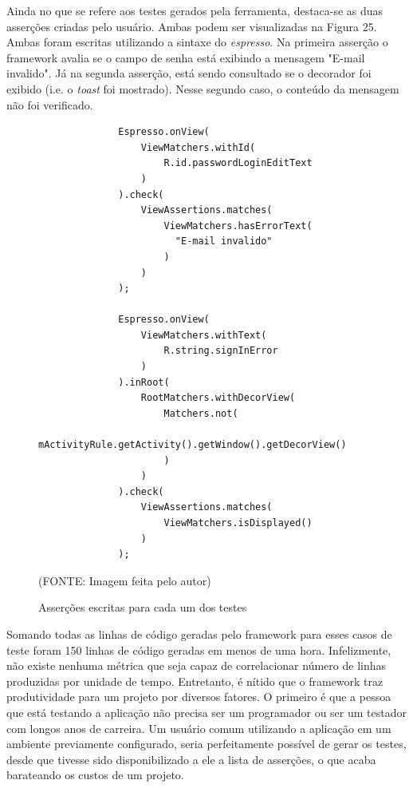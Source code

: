\documentclass[
    12pt,       %
    openright,      %
    twoside,      %
    a4paper,      %
    english,      %
    french,       %
    spanish,      %
    brazil,       %
    ]{abntex2}
\begin{document}
      Ainda no que se refere aos testes gerados pela ferramenta, destaca-se as duas asserções criadas
      pelo usuário. Ambas podem ser visualizadas na Figura 25. Ambas foram escritas utilizando a sintaxe
      do \textit{espresso}. Na primeira asserção o framework avalia se o campo de senha está
      exibindo a mensagem "E-mail invalido". Já na segunda asserção, está sendo consultado se o decorador
      foi exibido (i.e. o \textit{toast} foi mostrado). Nesse segundo caso, o conteúdo da mensagem não foi
      verificado.

      \begin{figure}[htpb]
          \begin{lstlisting}
              Espresso.onView(
                  ViewMatchers.withId(
                      R.id.passwordLoginEditText
                  )
              ).check(
                  ViewAssertions.matches(
                      ViewMatchers.hasErrorText(
                        "E-mail invalido"
                      )
                  )
              );

              Espresso.onView(
                  ViewMatchers.withText(
                      R.string.signInError
                  )
              ).inRoot(
                  RootMatchers.withDecorView(
                      Matchers.not(
                          mActivityRule.getActivity().getWindow().getDecorView()
                      )
                  )
              ).check(
                  ViewAssertions.matches(
                      ViewMatchers.isDisplayed()
                  )
              );
          \end{lstlisting}
          \caption{\label{fig:passaro}Asserções escritas para cada um dos testes}\vspace{-1.2\baselineskip}
          \centering
          \begin{center}(FONTE: Imagem feita pelo autor)\end{center}
      \end{figure}

      Somando todas as linhas de código geradas pelo framework para esses casos de teste foram 150 linhas
      de código geradas em menos de uma hora. Infelizmente, não existe nenhuma métrica que seja capaz de
      correlacionar número de linhas produzidas por unidade de tempo. Entretanto, é nítido que o framework
      traz produtividade para um projeto por diversos fatores. O primeiro é que a pessoa que está testando
      a aplicação não precisa ser um programador ou ser um testador com longos anos de carreira. Um usuário
      comum utilizando a aplicação em um ambiente previamente configurado, seria perfeitamente possível
      de gerar os testes, desde que tivesse sido disponibilizado a ele a lista de asserções,
      o que acaba barateando os custos de um projeto.
\end{document}
